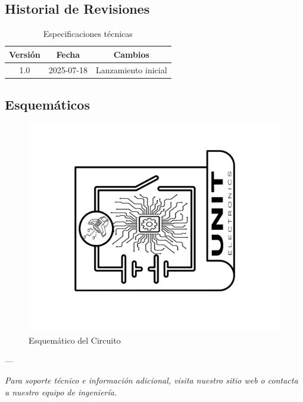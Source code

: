 \documentclass[11pt,a4paper]{article}
\begin{document}
\subsection{Historial de Revisiones}


\begin{table}[H]
\centering
\small
\begin{tabular}{|c|c|c|}
\hline
Versión & Fecha & Cambios \\
\hline
1.0 & 2025-07-18 & Lanzamiento inicial \\
\hline
\end{tabular}
\caption{Especificaciones técnicas}
\end{table}


\subsection{Esquemáticos}


\begin{figure}[H]
\centering
\includegraphics[width=\textwidth]{es_Schematics_icon.jpg}
\caption{Esquemático del Circuito}
\label{fig:es-Schematics-icon-jpg}
\end{figure}



---

\textit{Para soporte técnico e información adicional, visita nuestro sitio web o contacta a nuestro equipo de ingeniería.}
\end{document}
